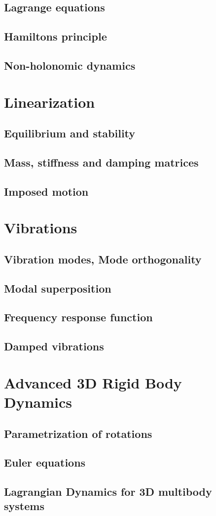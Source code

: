 \documentclass[10pt,a4paper]{scrartcl}
\begin{document}
\begin{multicols*}{2}
\subsection{Lagrange equations}
\subsection{Hamiltons principle}
\subsection{Non-holonomic dynamics}
\section{Linearization}
\subsection{Equilibrium and stability}
\subsection{Mass, stiffness and damping matrices}
\subsection{Imposed motion}
\section{Vibrations}
\subsection{Vibration modes, Mode orthogonality}
\subsection{Modal superposition}
\subsection{Frequency response function}
\subsection{Damped vibrations}
\section{Advanced 3D Rigid Body Dynamics}
\subsection{Parametrization of rotations}
\subsection{Euler equations}
\subsection{Lagrangian Dynamics for 3D multibody systems}
\end{multicols*}
\end{document}

